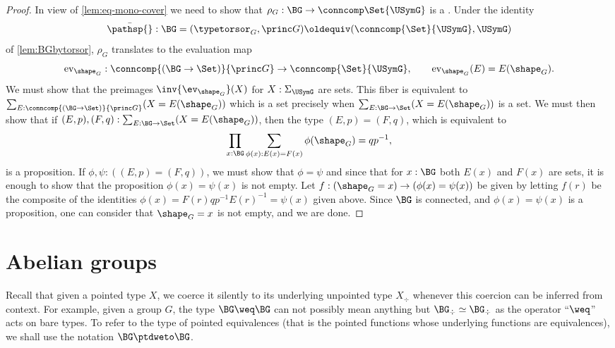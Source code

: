 \begin{proof}
  In view of \cref{lem:eq-mono-cover} we need to show that $\rho_G:\BG\to \conncomp \Set {\USymG}$ is a
  \covering.
  Under the identity
  $$\bar{\pathsp{}}:\BG=(\typetorsor_G,\princ G)\oldequiv (\conncomp{\Set}{\USymG},\USymG)$$ of
  \cref{lem:BGbytorsor}, $\rho_G$ translates to the
  evaluation map
  $$\mathrm{ev}_{\shape_G}:\conncomp{(\BG\to\Set)}{\princ G}\to\conncomp{\Set}{\USymG},\qquad
  \mathrm{ev}_{\shape_G}(E)=E(\shape_G).$$
  We must show that the preimages
  $\inv{\ev_{\shape_G}}(X)$ for $X:\Sigma_{\USymG}$ are sets.  This
  fiber is equivalent to
  $\sum_{E:\conncomp{(\BG\to\Set)}{\princ G}}(X=E(\shape_G))$ which is a
  set precisely when $\sum_{E:\BG\to\Set}(X=E(\shape_G))$ is a set.  We
  must then show that if $(E,p),(F,q):\sum_{E:\BG\to\Set}(X=E(\shape_G))$,
  then the type $(E,p)=(F,q)$, which is equivalent
to
  $$\prod_{x:\BG}\sum_{\phi(x):E(x)=F(x)}\phi(\shape_G)=qp^{-1},$$
  is a proposition.
If $\phi,\psi:((E,p)=(F,q))$, we
  must show that $\phi=\psi$ and since that for $x:\BG$ both $E(x)$ and
  $F(x)$ are sets, it is enough to show that the proposition
  $\phi(x)=\psi(x)$ is not empty.  Let
  $f:(\shape_G=x)\to(\phi(x)=\psi(x))$ be given by letting $f(r)$ be the
  composite of the identities $\phi(x)=F(r)qp^{-1}E(r)^{-1}=\psi(x)$
  given above.  Since $\BG$ is connected, and $\phi(x)=\psi(x)$ is a
  proposition, one can consider that $\shape_G=x$ is not empty, and we
  are done.
\end{proof}


\section{Abelian groups}
\label{sec:abelian-groups}

Recall that given a pointed type $X$, we coerce it silently to its
underlying unpointed type $X_\div$ whenever this coercion can be
inferred from context. For example, given a group $G$, the type
$\BG\weq \BG$ can not possibly mean anything but
$\BG_\div\simeq \BG_\div$ as the operator ``$\weq$'' acts on bare
types. To refer to the type of pointed equivalences (that is the
pointed functions whose underlying functions are equivalences), we
shall use the notation $\BG \ptdweto \BG$.%

